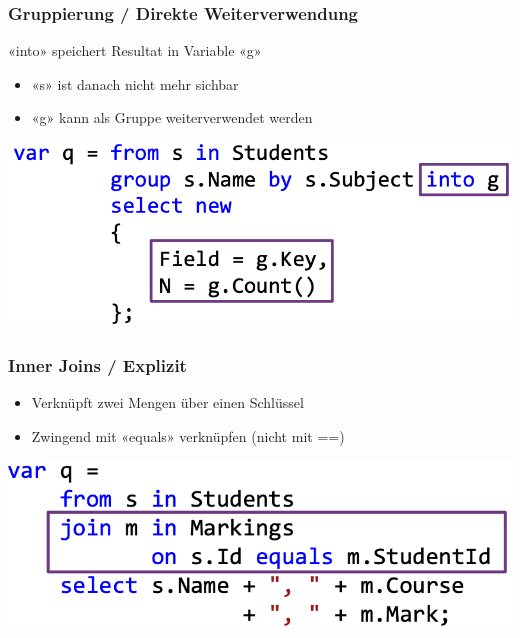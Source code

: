\subsubsection{Gruppierung / Direkte Weiterverwendung}
«into» speichert Resultat in Variable «g»
\begin{itemize}
    \item «s» ist danach nicht mehr sichbar
    \item «g» kann als Gruppe weiterverwendet werden
\end{itemize}
\vspace{-8pt}
\begin{center}
    \includegraphics[scale=.3]{graphic/linq/Gruppierung Direkte Weiterverwendung.png}
\end{center}
\vspace{-8pt}

\subsubsection{Inner Joins / Explizit}
\begin{itemize}
    \item Verknüpft zwei Mengen über einen Schlüssel
    \item Zwingend mit «equals» verknüpfen (nicht mit ==)
\end{itemize}
\vspace{-8pt}
\begin{center}
    \includegraphics[scale=.3]{graphic/linq/inner join.png}
\end{center}
\vspace{-8pt}

